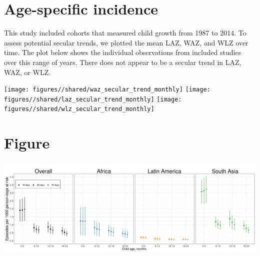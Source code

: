 \documentclass[
  9pt,
]{book}
\begin{document}
\hypertarget{age-specific-incidence-2}{%
\section{Age-specific incidence}\label{age-specific-incidence-2}}

This study included cohorts that measured child growth from 1987 to 2014. To assess potential secular trends, we plotted the mean LAZ, WAZ, and WLZ over time. The plot below shows the individual observations from included studies over this range of years. There does not appear to be a secular trend in LAZ, WAZ, or WLZ.

\texttt{[image: figures//shared/waz\_secular\_trend\_monthly]}
\texttt{[image: figures//shared/laz\_secular\_trend\_monthly]}
\texttt{[image: figures//shared/wlz\_secular\_trend\_monthly]}

\hypertarget{figure}{%
\section{Figure}\label{figure}}

\includegraphics[width=58.33in]{figures//wasting/fig-wast-2-ir-overall_region--allage-ir_sense}

  
\end{document}
